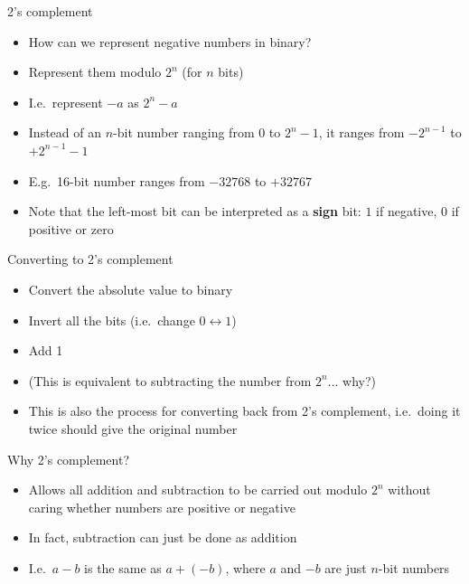 \begin{frame}{2's complement}
    \begin{itemize}
        \pause\item How can we represent negative numbers in binary?
        \pause\item Represent them modulo $2^n$ (for $n$ bits)
        \pause\item I.e.\ represent $-a$ as $2^n-a$
        \pause\item Instead of an $n$-bit number ranging from $0$ to $2^n-1$, it ranges from $-2^{n-1}$ to $+2^{n-1}-1$
        \pause\item E.g.\ 16-bit number ranges from $-32768$ to $+32767$
        \pause\item Note that the left-most bit can be interpreted as a \textbf{sign} bit:
            $1$ if negative, $0$ if positive or zero
    \end{itemize}
\end{frame}

\begin{frame}{Converting to 2's complement}
    \begin{itemize}
        \pause\item Convert the absolute value to binary
        \pause\item Invert all the bits (i.e.\ change $0 \leftrightarrow 1$)
        \pause\item Add 1
        \pause\item (This is equivalent to subtracting the number from $2^n$... why?)
        \pause\item This is also the process for converting back from 2's complement,
            i.e.\ doing it twice should give the original number
    \end{itemize}
\end{frame}

\begin{frame}{Why 2's complement?}
    \begin{itemize}
        \pause\item Allows all addition and subtraction to be carried out modulo $2^n$
            without caring whether numbers are positive or negative
        \pause\item In fact, subtraction can just be done as addition
        \pause\item I.e.\ $a-b$ is the same as $a+(-b)$, where $a$ and $-b$ are just $n$-bit numbers
    \end{itemize}
\end{frame}
